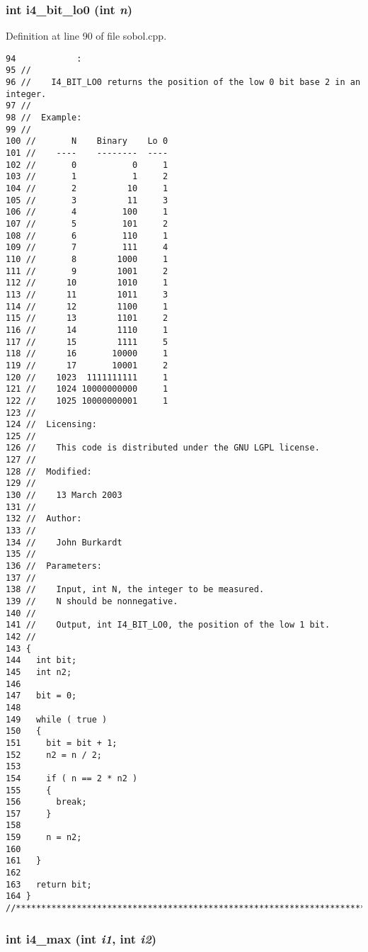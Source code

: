 \subsubsection{\setlength{\rightskip}{0pt plus 5cm}int i4\_\-bit\_\-lo0 (int {\em n})}\label{test_2sobol_8H_2f2ea13fe07e02ffc849fcd0c57c8220}




Definition at line 90 of file sobol.cpp.

\begin{Code}\begin{verbatim}94            :
95 //
96 //    I4_BIT_LO0 returns the position of the low 0 bit base 2 in an integer.
97 //
98 //  Example:
99 //
100 //       N    Binary    Lo 0
101 //    ----    --------  ----
102 //       0           0     1
103 //       1           1     2
104 //       2          10     1
105 //       3          11     3 
106 //       4         100     1
107 //       5         101     2
108 //       6         110     1
109 //       7         111     4
110 //       8        1000     1
111 //       9        1001     2
112 //      10        1010     1
113 //      11        1011     3
114 //      12        1100     1
115 //      13        1101     2
116 //      14        1110     1
117 //      15        1111     5
118 //      16       10000     1
119 //      17       10001     2
120 //    1023  1111111111     1
121 //    1024 10000000000     1
122 //    1025 10000000001     1
123 //
124 //  Licensing:
125 //
126 //    This code is distributed under the GNU LGPL license. 
127 //
128 //  Modified:
129 //
130 //    13 March 2003
131 //
132 //  Author:
133 //
134 //    John Burkardt
135 //
136 //  Parameters:
137 //
138 //    Input, int N, the integer to be measured.
139 //    N should be nonnegative.
140 //
141 //    Output, int I4_BIT_LO0, the position of the low 1 bit.
142 //
143 {
144   int bit;
145   int n2;
146 
147   bit = 0;
148 
149   while ( true )
150   {
151     bit = bit + 1;
152     n2 = n / 2;
153 
154     if ( n == 2 * n2 )
155     {
156       break;
157     }
158 
159     n = n2;
160 
161   }
162 
163   return bit;
164 }
//****************************************************************************80
\end{verbatim}
\end{Code}


\subsubsection{\setlength{\rightskip}{0pt plus 5cm}int i4\_\-max (int {\em i1}, int {\em i2})}\label{test_2sobol_8H_36f800e4593bdd258feaeb43cf42adf7}




